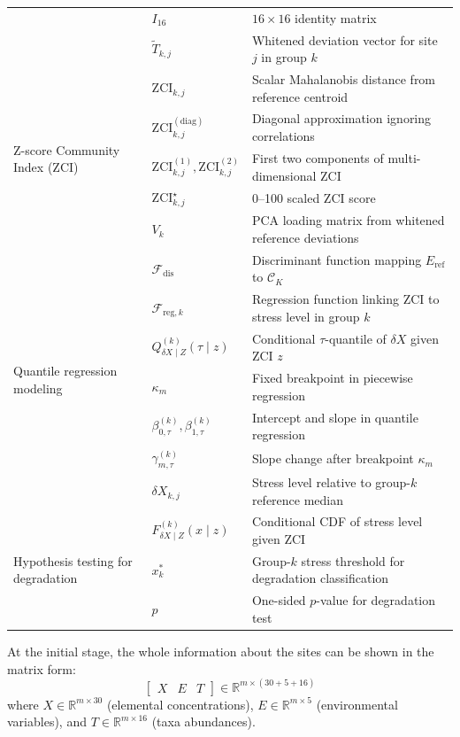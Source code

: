 \begin{table}[!h]
\begin{tabular}{lll}
& $I_{16}$ & $16\times16$ identity matrix \\
& $\tilde{T}_{k,j}$ & Whitened deviation vector for site $j$ in group $k$ \\
\midrule
\multirow{5}{*}{\parbox{3cm}{\centering Z-score Community Index (ZCI)}} 
& $\mathrm{ZCI}_{k,j}$ & Scalar Mahalanobis distance from reference centroid \\
& $\mathrm{ZCI}^{(\mathrm{diag})}_{k,j}$ & Diagonal approximation ignoring correlations \\
& $\mathrm{ZCI}^{(1)}_{k,j}, \mathrm{ZCI}^{(2)}_{k,j}$ & First two components of multi-dimensional ZCI \\
& $\mathrm{ZCI}^\star_{k,j}$ & 0--100 scaled ZCI score \\
& $V_k$ & PCA loading matrix from whitened reference deviations \\
\midrule
\multirow{7}{*}{\parbox{3cm}{\centering Quantile regression modeling}} 
& $\mathcal{F}_{\mathrm{dis}}$ & Discriminant function mapping $E_{\mathrm{ref}}$ to $\mathcal{C}_K$ \\
& $\mathcal{F}_{\mathrm{reg},k}$ & Regression function linking ZCI to stress level in group $k$ \\
& $Q_{\delta X\mid Z}^{(k)}(\tau \mid z)$ & Conditional $\tau$-quantile of $\delta X$ given ZCI $z$ \\
& $\kappa_m$ & Fixed breakpoint in piecewise regression \\
& $\beta_{0,\tau}^{(k)}, \beta_{1,\tau}^{(k)}$ & Intercept and slope in quantile regression \\
& $\gamma_{m,\tau}^{(k)}$ & Slope change after breakpoint $\kappa_m$ \\
& $\delta X_{k,j}$ & Stress level relative to group-$k$ reference median \\
\midrule
\multirow{3}{*}{\parbox{3cm}{\centering Hypothesis testing for degradation}} 
& $F_{\delta X\mid Z}^{(k)}(x \mid z)$ & Conditional CDF of stress level given ZCI \\
& $x_k^*$ & Group-$k$ stress threshold for degradation classification \\
& $p$ & One-sided $p$-value for degradation test \\
\bottomrule
\end{tabular}
\end{table}



At the initial stage, the whole information about the sites can be shown in the matrix form:
\[
\left[
\begin{array}{ccc}
X & E & T
\end{array}
\right]
\in
\mathbb{R}^{m \times (30 + 5 + 16)}
\]
where
\(X \in \mathbb{R}^{m \times 30}\) (elemental concentrations),
\(E \in \mathbb{R}^{m \times 5}\) (environmental variables),
and
\(T \in \mathbb{R}^{m \times 16}\) (taxa abundances).

